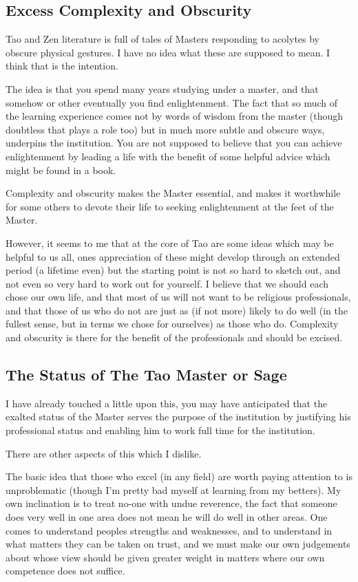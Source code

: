 \documentclass[numreferences]{rbjk}
\begin{document}
\begin{article}
\subsection{Excess Complexity and Obscurity}

Tao and Zen literature is full of tales of Masters responding to acolytes by obscure physical gestures.
I have no idea what these are supposed to mean.
I think that is the intention.

The idea is that you spend many years studying under a master, and that somehow or other eventually you find enlightenment.
The fact that so much of the learning experience comes not by words of wisdom from the master (though doubtless that plays a role too) but in much more subtle and obscure ways, underpins the institution.
You are not supposed to believe that you can achieve enlightenment by leading a life with the benefit of some helpful advice which might be found in a book.

Complexity and obscurity makes the Master essential, and makes it worthwhile for some others to devote their life to seeking enlightenment at the feet of the Master.

However, it seems to me that at the core of Tao are some ideas which may be helpful to us all, ones appreciation of these might develop through an extended period (a lifetime even) but the starting point is not so hard to sketch out, and not even so very hard to work out for yourself.
I believe that we should each chose our own life, and that most of us will not want to be religious professionals, and that those of us who do not are just as (if not more) likely to do well (in the fullest sense, but in terms we chose for ourselves) as those who do.
Complexity and obscurity is there for the benefit of the professionals and should be excised.

\subsection{The Status of The Tao Master or Sage}

I have already touched a little upon this, you may have anticipated that the exalted status of the Master serves the purpose of the institution by justifying his professional status and enabling him to work full time for the institution.  

There are other aspects of this which I dislike.

The basic idea that those who excel (in any field) are worth paying attention to is unproblematic (though I'm pretty bad myself at learning from my betters).
My own inclination is to treat no-one with undue reverence, the fact that someone does very well in one area does not mean he will do well in other areas.
One comes to understand peoples strengths and weaknesses, and to understand in what matters they can be taken on trust, and we must make our own judgements about whose view should be given greater weight in matters where our own competence does not suffice.


\end{article}
\end{document}
